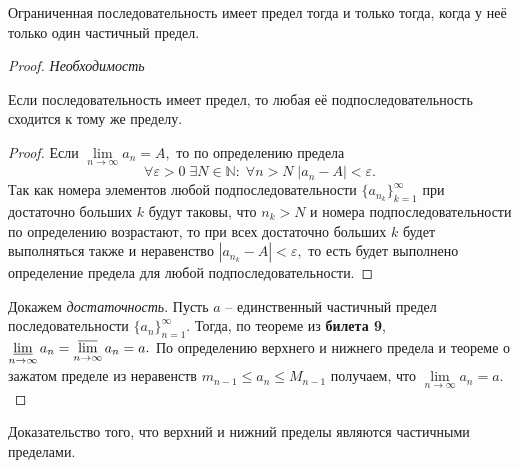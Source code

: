 \begin{theorem}
    Ограниченная последовательность имеет предел
    тогда и только тогда, когда у неё только
    один частичный предел.
\end{theorem}
\begin{proof}
    \emph{Необходимость}
    \begin{proposition}
        Если последовательность имеет предел,
        то любая её подпоследовательность сходится
        к тому же пределу.
    \end{proposition}
    \begin{proof}
        Если $\lim\limits_{n\rightarrow\infty}
            a_{n}=A,$ то по определению предела
        $$
            \forall \varepsilon>0\;\exists
            N\in\mathbb{N}:\;
            \forall n>N\;
            |a_n-A|<\varepsilon.
        $$
        Так как номера элементов любой
        подпоследовательности
        $\{a_{n_k}\}_{k=1}^{\infty}$ при
        достаточно больших $k$ будут таковы, что
        $n_k>N$ и номера
        подпоследовательности по определению
        возрастают, то при всех
        достаточно больших $k$ будет
        выполняться также и неравенство
        $|a_{n_k}-A|<\varepsilon,$ то есть
        будет выполнено определение предела
        для любой подпоследовательности.
    \end{proof}

    Докажем \emph{достаточность}.
    Пусть $a$ -- единственный частичный предел
    последовательности $\{a_n\}_{n=1}^{\infty}.$
    Тогда, по теореме из \textbf{билета 9},
    $\operatorname*{\underline{lim}}\limits_{n\rightarrow\infty}a_n=
        \operatorname*{\overline{lim}}\limits_{n\rightarrow\infty}a_n=a.$
    По определению верхнего и нижнего предела
    и теореме о зажатом пределе из неравенств
    $m_{n-1}\leq a_n\leq M_{n-1}$
    получаем, что $\lim\limits_{n\rightarrow\infty}
        a_n=a.$
\end{proof}

\newpage
\begin{problem}
Доказательство того, что верхний и нижний пределы являются частичными пределами.
\end{problem}

